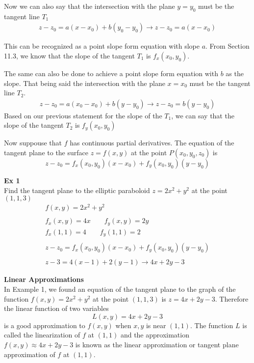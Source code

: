 \documentclass{article}
\begin{document}
  Now we can also say that the intersection with the plane $ y=y_{0}$ must be the tangent line $ T_{1}$
  \[
    \begin{gathered}
    z-z_{0}=a(x-x_{0})+b(y_{0} -y_{0} ) \to 
    z-z_{0}=a(x-x_{0} ) 
    \end{gathered}
  \]
  
  This can be recognized as a point slope form equation with slope $ a $. From Section 11.3, we know that the slope of the tangent $ T_{1}  $ is $ f_{x} (x_{0},y_{0})$. 

  The same can also be done to achieve a point slope form equation with $ b $ as the slope. That being said the intersection with the plane $ x=x_{0}  $ must be the tangent line $ T_{2} $. 
  \[
    \begin{gathered}
    z-z_{0}=a(x_{0} -x_{0})+b(y -y_{0} ) \to 
    z-z_{0}=b(y-y_{0} ) 
    \end{gathered}
  \]
  Based on our previous statement for the slope of the $ T_{1}  $, we can say that the slope of the tangent $ T_{2}  $ is $ f_{y}(x_{0},y_{0}  )  $  

  Now suppouse that $ f $ has continuous partial derivatives. The equation of the tangent plane to the surface $ z=f(x,y) $ at the point $ P(x_{0},y_{0},z_{0}   ) $ is
  \[
    z-z_{0}=f_{x}(x_{0},y_{0}  )(x-x_{0})+f_{y}(x_{0},y_{0}  )(y-y_{0} )   
  \]

  \textbf{Ex 1}\\
  Find the tangent plane to the elliptic paraboloid $ z=2x^{2}+y^{2}   $ at the point $ (1,1,3) $
  \[
    \begin{gathered}
    f(x,y) = 2x^{2}+y^{2}\\
    ~\\
    f_{x}(x,y)=4x \qquad f_{y}(x,y)=2y\\
    f_{x}(1,1)=4 \qquad f_{y}(1,1)=2\\
    ~\\
     z-z_{0}=f_{x}(x_{0},y_{0}  )(x-x_{0})+f_{y}(x_{0},y_{0}  )(y-y_{0} )\\
     ~\\
     z-3=4(x-1)+2(y-1)\to \boxed{4x+2y-3}   
    \end{gathered}
  \]

  \textbf{Linear Approximations}\\
  In Example 1, we found an equation of the tangent plane to the graph of the function $ f(x,y)=2x^{2}+y^{2}   $ at the point $ (1,1,3) $ is $ z=4x+2y-3 $. Therefore the linear function of two variables
  \[
    L(x,y)=4x+2y-3
  \]
  is a good approximation to $ f(x,y) $ when $ x,y $ is near $ (1,1) $. The function $ L $ is called the linearization of $ f $ at $ (1,1) $ and the approximation $ f(x,y) \approx 4x+2y-3 $ is known as the linear approximation or tangent plane approximation of $ f $ at $ (1,1) $.
\end{document}
